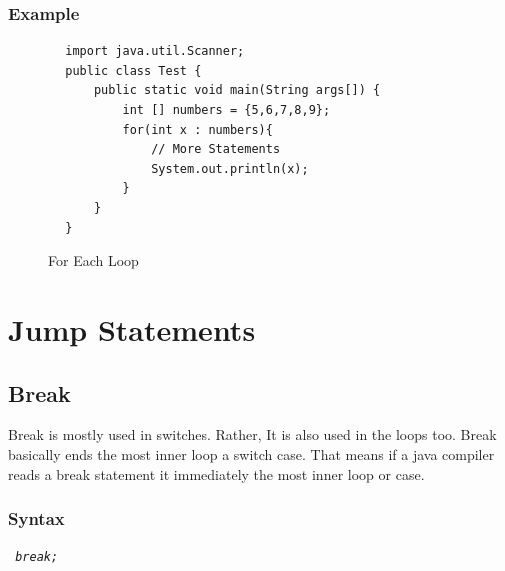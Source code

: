\documentclass[openany]{book}  %
\begin{document}
\subsubsection{Example}
\begin{center}
    \begin{verbatim}
        import java.util.Scanner;
        public class Test {
            public static void main(String args[]) {
                int [] numbers = {5,6,7,8,9};
                for(int x : numbers){
                    // More Statements
                    System.out.println(x);
                }
            }
        }
    \end{verbatim}
\end{center}
% 
%
\begin{figure}[htbp]
    \begin{center}
        \caption{For Each Loop}
    \end{center}
\end{figure}

% 
% 
\section{Jump Statements}
% 
% 
\subsection{Break}
Break is mostly used in switches.
Rather, It is also used in the loops too. Break basically ends the most inner loop a switch case. That means if a java compiler reads a break statement
it immediately the most inner loop or case.
% 
% 
\subsubsection{Syntax}
\begin{center}
    \tt{
        \textit{break;}
    }
\end{center}
% 
%
\end{document}
